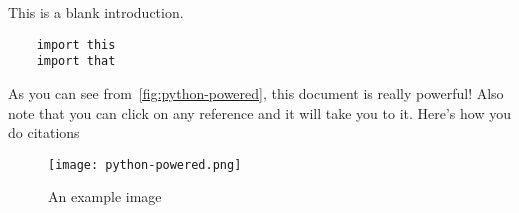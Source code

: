 
This is a blank introduction.


\begin{verbatim}
    import this
    import that
\end{verbatim}

As you can see from~\autoref{fig:python-powered}, this document is really powerful! Also note that you can click on any reference and it will take you to it. Here's how you do citations~\cite{fast-eig}

\begin{figure}[H]
    \centering
    \texttt{[image: python-powered.png]}
    \caption{An example image}\label{fig:python-powered}
\end{figure}
